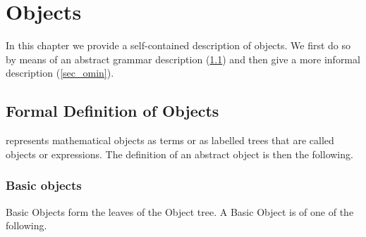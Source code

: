 \chapter{\OM Objects}\label{cha_obj}

In this chapter we provide a self-contained description of \OM objects. We first do so by
means of an abstract grammar description (\ref{sec_omabs}) and then give a more informal
description (\ref{sec_omin}).

\section{Formal Definition of \OM Objects}\label{sec_omabs}


\OM represents mathematical objects as terms or as labelled
trees that are called \OM objects or \OM expressions. The definition
of an abstract \OM object is then the following.



\subsection{Basic \OM objects}\label{sec_basic} 

Basic \OM Objects form the leaves of the \OM Object tree.  A Basic \OM Object is of one of
the following.
 
